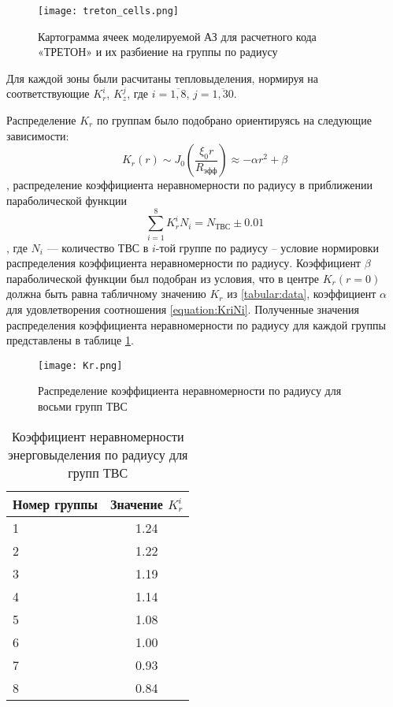 \begin{figure}[H]
	\begin{center}
		\texttt{[image: treton\_cells.png]}
		\caption{Картограмма ячеек моделируемой АЗ для расчетного кода «ТРЕТОН» и их разбиение на группы по радиусу}
		\label{pic:treton-kartogramma}
	\end{center}
\end{figure}


Для каждой зоны были расчитаны тепловыделения, нормируя на соответствующие $K_r^i$, $K_z^j$, где $i = \overline{1, 8}$, $j = \overline {1, 30}$.

Распределение $K_r$ по группам было подобрано ориентируясь на следующие зависимости:
\begin{equation}
    K_r(r) \sim J_0(\frac{\xi_0 r}{R_{\text{эфф}}}) \approx - \alpha r^2 + \beta
\end{equation}, распределение коэффициента неравномерности по радиусу в приближении параболической функции
\begin{equation}
    \label{equation:KriNi}
    \sum_{i=1}^{8} K_r^i N_i = N_{\text{ТВС}} \pm 0.01
\end{equation}, где $N_i$ — количество ТВС в $i$-той группе по радиусу – условие нормировки распределения коэффициента неравномерности по радиусу.
Коэффициент $\beta$ параболической функции был подобран из условия, что в центре $K_r(r=0)$ должна быть равна табличному значению $K_r$ из \ref{tabular:data}, коэффициент $\alpha$ для удовлетворения соотношения \ref{equation:KriNi}. Полученные значения распределения коэффициента неравномерности по радиусу для каждой группы представлены в таблице \ref{tabular:Kri}.

\begin{figure}[H]
	\begin{center}
		\texttt{[image: Kr.png]}
		\caption{Распределение коэффициента неравномерности по радиусу для восьми групп ТВС}
		\label{pic:Kr}
	\end{center}
\end{figure}

\begin{table}[H]
	\caption{Коэффициент неравномерности энерговыделения по радиусу для групп ТВС}
	\begin{center}
        \begin{tabular}{|l|c|}
        \toprule
         Номер группы & Значение $K_r^i$ \\
         \midrule
         \hline
         1 & 1.24 \\
         \hline
         2 & 1.22 \\
         \hline
         3 & 1.19 \\
         \hline
         4 & 1.14 \\
         \hline
         5 & 1.08 \\
         \hline
         6 & 1.00 \\
         \hline
         7 & 0.93 \\
         \hline
         8 & 0.84 \\
         \bottomrule
		\end{tabular}
		\label{tabular:Kri}
	\end{center}
\end{table}


